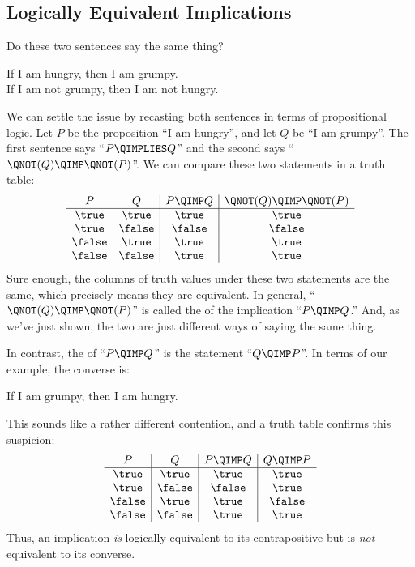 \subsection{Logically Equivalent Implications}\label{sec:logical_equivalence}

Do these two sentences say the same thing?
%
\begin{center}
If I am hungry, then I am grumpy. \\
If I am not grumpy, then I am not hungry.
\end{center}
%
We can settle the issue by recasting both sentences in terms of
propositional logic.
Let $P$ be the proposition ``I am hungry'', and let $Q$ be ``I am
grumpy''.  The first sentence says ``$P \QIMPLIES Q$'' and the second
says ``$\QNOT(Q) \QIMP \QNOT(P)$''.  We can compare these two
statements in a truth table:
%
\[
\begin{array}{c|c|c|c}
P & Q &
    P \QIMP Q &
    \QNOT(Q) \QIMP \QNOT(P) \\ \hline
\true & \true & \true & \true \\
\true & \false & \false & \false \\
\false & \true & \true & \true \\
\false & \false & \true & \true
\end{array}
\]
%
Sure enough, the columns of truth values under these two statements are
the same, which precisely means they are equivalent.  In general,
``$\QNOT(Q) \QIMP \QNOT(P)$'' is called the  of
the implication ``$P \QIMP Q$.''  And, as we've just shown, the two
are just different ways of saying the same thing.

In contrast, the  of ``$P \QIMP Q$'' is the statement
``$Q \QIMP P$''.  In terms of our example, the converse is:
%
\begin{center}
If I am grumpy, then I am hungry.
\end{center}
%
This sounds like a rather different contention, and a truth table
confirms this suspicion:
%
\[
\begin{array}{c|c|c|c}
P & Q &
    P \QIMP Q &
    Q \QIMP P \\ \hline
\true & \true & \true & \true \\
\true & \false & \false & \true \\
\false & \true & \true & \false \\
\false & \false & \true & \true
\end{array}
\]
%
Thus, an implication \textit{is} logically equivalent to its
contrapositive but is \textit{not} equivalent to its converse.

